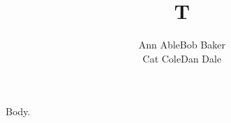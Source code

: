 \documentclass{article}
\makeatletter
\let\pp\par
\newcommand\parts{\endgraf}
\newcommand\partsa{\pp}
\newcommand\partsb{\@@par}
\makeatother
\begin{document}
\title{T}
\author{Ann Able\parts Bob Baker\partsa Cat Cole\partsb Dan Dale}
\maketitle
Body.
\end{document}
